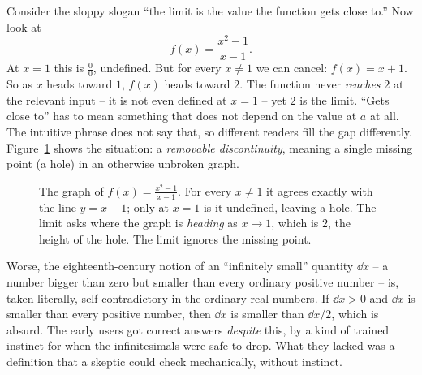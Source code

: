 \begin{intuitionbox}
Consider the sloppy slogan ``the limit is the value the function gets close to.''
Now look at
\[
  f(x) = \frac{x^2 - 1}{x - 1}.
\]
At $x = 1$ this is $\tfrac{0}{0}$, undefined. But for every $x \ne 1$ we can
cancel: $f(x) = x + 1$. So as $x$ heads toward $1$, $f(x)$ heads toward $2$. The
function never \emph{reaches} $2$ at the relevant input -- it is not even
defined at $x=1$ -- yet $2$ is the limit. ``Gets close to'' has to
mean something that does not depend on the value at $a$ at all. The intuitive
phrase does not say that, so different readers fill the gap
differently. Figure~\ref{ch06:fig-hole} shows the situation: a \emph{removable
discontinuity}, meaning a single missing point (a hole) in an otherwise
unbroken graph.
\end{intuitionbox}

\begin{figure}[htbp]
\centering
{}
\caption{The graph of $f(x)=\frac{x^2-1}{x-1}$. For every $x\ne1$ it agrees
exactly with the line $y=x+1$; only at $x=1$ is it undefined, leaving a
hole. The limit asks where the graph is \emph{heading} as $x\to1$, which is
$2$, the height of the hole. The limit ignores the missing point.}
\label{ch06:fig-hole}
\end{figure}

Worse, the eighteenth-century notion of an ``infinitely small'' quantity $\dd x$
-- a number bigger than zero but smaller than every ordinary positive number --
is, taken literally, self-contradictory in the ordinary real numbers. If
$\dd x > 0$ and $\dd x$ is smaller than every positive number, then $\dd x$ is
smaller than $\dd x / 2$, which is absurd. The early users got correct answers
\emph{despite} this, by a kind of trained instinct for when the infinitesimals
were safe to drop. What they lacked was a definition that a skeptic could check
mechanically, without instinct.

